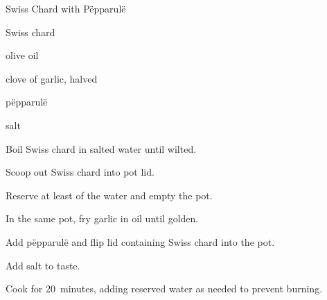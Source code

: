 \begin{recipe}{Swiss Chard with P\"epparul\"e}{}{}

\begin{ingredients}
\item Swiss chard
\item olive oil
\item clove of garlic, halved
\item p\"epparul\"e
\item salt
\end{ingredients}

\begin{directions}
\item Boil Swiss chard in salted water until wilted.
\item Scoop out Swiss chard into pot lid.
\item Reserve at least  of the water and empty the pot.
\item In the same pot, fry garlic in oil until golden.
\item Add p\"epparul\"e and flip lid containing Swiss chard into the pot.
\item Add salt to taste.
\item Cook for 20~minutes, adding reserved water as needed to prevent burning.
\end{directions}

\end{recipe}
